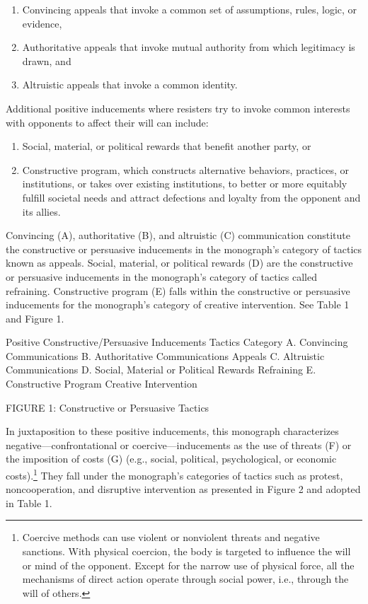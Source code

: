 \documentclass[twoside,a4paper,12pt,fleqn,openany]{extbook}
\begin{document}
\begin{enumerate}
\item Convincing appeals that invoke a common set of assumptions, rules, logic, or evidence,
\item Authoritative appeals that invoke mutual authority from which legitimacy is drawn, and
\item Altruistic appeals that invoke a common identity.
\end{enumerate}

Additional positive inducements where resisters try to invoke common interests with opponents to affect their will can include:

\begin{enumerate}
\item Social, material, or political rewards that benefit another party, or
\item Constructive program, which constructs alternative behaviors, practices, or institutions, or takes over existing institutions, to better or more equitably fulfill societal needs and attract defections and loyalty from the opponent and its allies.\end{enumerate}

Convincing (A), authoritative (B), and altruistic (C) communication constitute the constructive or persuasive inducements in the monograph’s category of tactics known as appeals. Social, material, or political rewards (D) are the constructive or persuasive inducements in the monograph’s category of tactics called refraining. Constructive program (E) falls within the constructive or persuasive inducements for the monograph’s category of creative intervention. See Table 1 and Figure 1.

Positive
Constructive/Persuasive
Inducements
Tactics Category
A. Convincing Communications
B. Authoritative Communications
Appeals
C. Altruistic Communications
D. Social, Material or Political Rewards
Refraining
E. Constructive Program
Creative Intervention

FIGURE 1: Constructive or Persuasive Tactics

In juxtaposition to these positive inducements, this monograph characterizes negative—confrontational or coercive—inducements as the use of threats (F) or the imposition of costs (G) (e.g., social, political, psychological, or economic costs).\footnote{Coercive methods can use violent or nonviolent threats and negative sanctions. With physical coercion, the body is targeted to influence the will or mind of the opponent. Except for the narrow use of physical force, all the mechanisms of direct action operate through social power, i.e., through the will of others.} They fall under the monograph’s categories of tactics such as protest, noncooperation, and disruptive intervention as presented in Figure 2 and adopted in Table 1.
\end{document}
